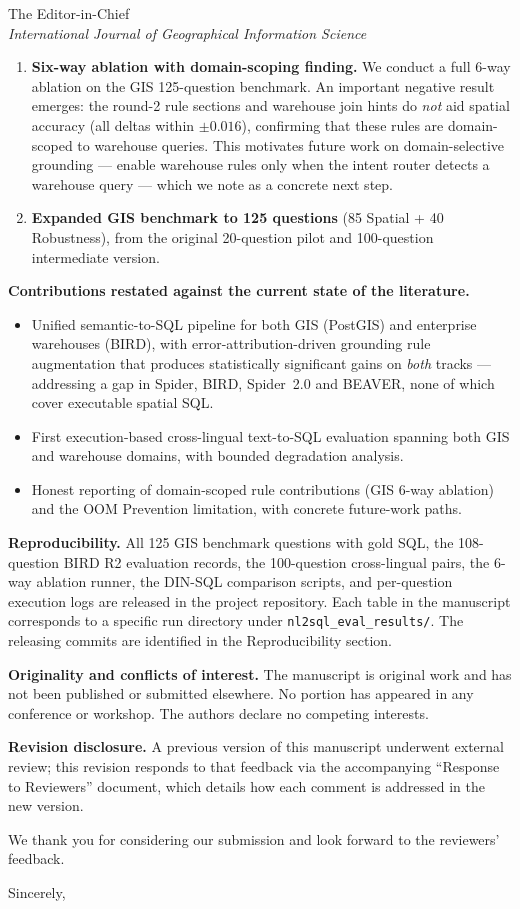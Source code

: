 \documentclass[11pt]{letter}
\begin{document}
\begin{letter}{The Editor-in-Chief \\ \emph{International Journal of Geographical Information Science}}
\begin{enumerate}
\item \textbf{Six-way ablation with domain-scoping finding.} We conduct a full 6-way ablation on the GIS 125-question benchmark. An important negative result emerges: the round-2 rule sections and warehouse join hints do \emph{not} aid spatial accuracy (all deltas within $\pm 0.016$), confirming that these rules are domain-scoped to warehouse queries. This motivates future work on domain-selective grounding --- enable warehouse rules only when the intent router detects a warehouse query --- which we note as a concrete next step.

\item \textbf{Expanded GIS benchmark to 125 questions} (85 Spatial + 40 Robustness), from the original 20-question pilot and 100-question intermediate version.
\end{enumerate}

\medskip
\noindent\textbf{Contributions restated against the current state of the literature.}
\begin{itemize}
\item Unified semantic-to-SQL pipeline for both GIS (PostGIS) and enterprise warehouses (BIRD), with error-attribution-driven grounding rule augmentation that produces statistically significant gains on \emph{both} tracks --- addressing a gap in Spider, BIRD, Spider~2.0 and BEAVER, none of which cover executable spatial SQL.
\item First execution-based cross-lingual text-to-SQL evaluation spanning both GIS and warehouse domains, with bounded degradation analysis.
\item Honest reporting of domain-scoped rule contributions (GIS 6-way ablation) and the OOM Prevention limitation, with concrete future-work paths.
\end{itemize}

\medskip
\noindent\textbf{Reproducibility.} All 125 GIS benchmark questions with gold SQL, the 108-question BIRD R2 evaluation records, the 100-question cross-lingual pairs, the 6-way ablation runner, the DIN-SQL comparison scripts, and per-question execution logs are released in the project repository. Each table in the manuscript corresponds to a specific run directory under \texttt{nl2sql\_eval\_results/}. The releasing commits are identified in the Reproducibility section.

\medskip
\noindent\textbf{Originality and conflicts of interest.} The manuscript is original work and has not been published or submitted elsewhere. No portion has appeared in any conference or workshop. The authors declare no competing interests.

\medskip
\noindent\textbf{Revision disclosure.} A previous version of this manuscript underwent external review; this revision responds to that feedback via the accompanying ``Response to Reviewers'' document, which details how each comment is addressed in the new version.

We thank you for considering our submission and look forward to the reviewers' feedback.

\closing{Sincerely,}

\end{letter}
\end{document}
